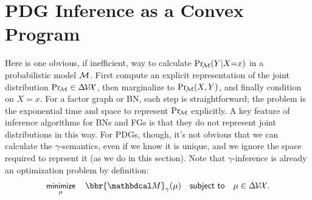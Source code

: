 \documentclass{article}
\newcommand\discard[1]{}
\begin{document}
\section{PDG Inference as a Convex Program}
    \label{sec:inf-as-cvx-program}

Here is one obvious, if inefficient, way to calculate $\Pr_{\!\cal M}(Y|X{=}x)$ in a
probabilistic model $\cal M$. 
First compute an explicit representation of the joint distribution 
$\Pr_{\!\cal M} \in \Delta\mskip-2mu\mathcal V\!\mathcal X$, 
then marginalize to $\Pr_{\!\cal M}(X,Y)$, and finally condition on $X{=}x$.
%
For a factor graph or BN,
each step is
straightforward;
the problem is the exponential time and space to represent $\Pr_{\!\cal M}$ explicitly.
A key feature of inference algorithms for BNs and FGs is that they
do not represent joint distributions in this way.
%
For PDGs, though, it's not
obvious that
we can calculate the $\gamma$-semantics,
even if
we know it is unique, and
we ignore the space required to reprsent it (as we do in this section).
Note that $\gamma$-inference is already an optimization problem by definition:
\[
    \minimize_\mu\quad
        \bbr{\dg M}_\gamma(\mu)
    \quad \text{\sf subject to}\quad \mu \in \Delta\mskip-2mu\V\mskip-2mu\X.
\]
\end{document}
